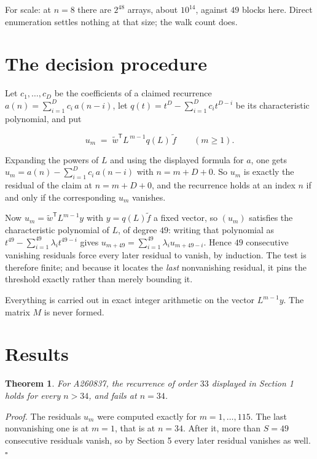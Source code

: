 \documentclass[11pt]{article}
\newtheorem{theorem}{Theorem}
\theoremstyle{definition}
\begin{document}
For scale: at $n = 8$ there are $2^{48}$ arrays, about $10^{14}$, against $49$ blocks here. Direct enumeration settles nothing at that size; the walk count does.

\section{The decision procedure}

Let $c_1,\dots,c_D$ be the coefficients of a claimed recurrence $a(n) = \sum_{i=1}^{D} c_i\,a(n-i)$, let $q(t) = t^{D} - \sum_{i=1}^{D} c_i t^{D-i}$ be its characteristic polynomial, and put

\[u_m \;=\; \tilde w^{\mathsf T} L^{\,m-1} q(L)\,\tilde f \qquad (m \ge 1).\]

Expanding the powers of $L$ and using the displayed formula for $a$, one gets $u_m = a(n) - \sum_{i=1}^{D} c_i\,a(n-i)$ with $n = m + D + 0$. So $u_m$ is exactly the residual of the claim at $n = m + D + 0$, and the recurrence holds at an index $n$ if and only if the corresponding $u_m$ vanishes.

Now $u_m = \tilde w^{\mathsf T} L^{m-1} y$ with $y = q(L)\tilde f$ a fixed vector, so $(u_m)$ satisfies the characteristic polynomial of $L$, of degree $49$: writing that polynomial as $t^{49} - \sum_{i=1}^{49} \lambda_i t^{49-i}$ gives $u_{m+49} = \sum_{i=1}^{49} \lambda_i u_{m+49-i}$. Hence $49$ consecutive vanishing residuals force every later residual to vanish, by induction. The test is therefore finite; and because it locates the {\itshape last} nonvanishing residual, it pins the threshold exactly rather than merely bounding it.

Everything is carried out in exact integer arithmetic on the vector $L^{m-1}y$. The matrix $M$ is never formed.

\section{Results}

\begin{theorem} For A260837, the recurrence of order $33$ displayed in Section 1 holds for every $n > 34$, and fails at $n = 34$.\end{theorem}

{\itshape Proof.} The residuals $u_m$ were computed exactly for $m = 1,\dots,115$. The last nonvanishing one is at $m = 1$, that is at $n = 34$. After it, more than $S = 49$ consecutive residuals vanish, so by Section 5 every later residual vanishes as well. $\square$
\end{document}
